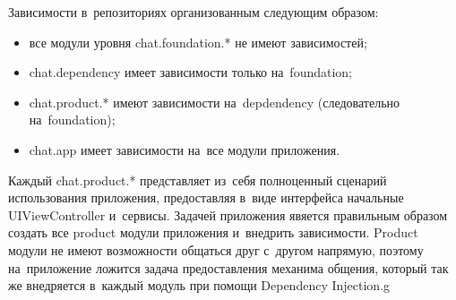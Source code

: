 Зависимости в~репозиториях организованным следующим образом: 

\begin{itemize}
\item все модули уровня chat.foundation.* не имеют зависимостей;
\item chat.dependency имеет зависимости только на~foundation;
\item chat.product.* имеют зависимости на~depdendency (следовательно на~foundation);
\item chat.app имеет зависимости на~все модули приложения.
\end{itemize}

Каждый chat.product.* представляет из~себя полноценный сценарий использования приложения, предоставляя в~виде интерфейса начальные UIViewController и~сервисы. Задачей приложения явяется правильным образом создать все product модули приложения и~внедрить зависимости. Product модули не имеют возможности общаться друг с~другом напрямую, поэтому на~приложение ложится задача предоставления механима общения, который так же внедряется в~каждый модуль при помощи Dependency Injection.g